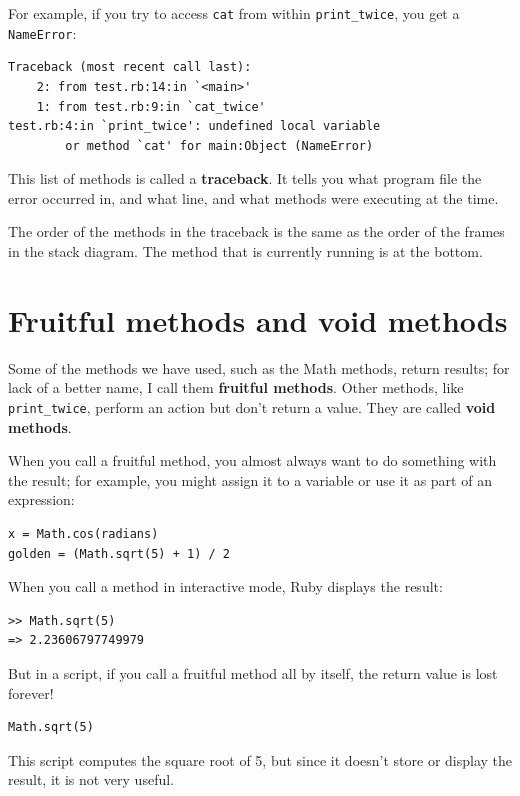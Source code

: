 \documentclass[10pt]{book}
\begin{document}
For example, if you try to access {\tt cat} from within 
\verb"print_twice", you get a {\tt NameError}:

\begin{verbatim}
Traceback (most recent call last):
	2: from test.rb:14:in `<main>'
	1: from test.rb:9:in `cat_twice'
test.rb:4:in `print_twice': undefined local variable
        or method `cat' for main:Object (NameError)
\end{verbatim}
%
This list of methods is called a {\bf traceback}.  It tells you what
program file the error occurred in, and what line, and what methods
were executing at the time.

The order of the methods in the traceback is the same as the
order of the frames in the stack diagram.  The method that is
currently running is at the bottom.


\section{Fruitful methods and void methods}

Some of the methods we have used, such as the Math methods, return
results; for lack of a better name, I call them {\bf fruitful
  methods}.  Other methods, like \verb"print_twice", perform an
action but don't return a value.  They are called {\bf void
  methods}.

When you call a fruitful method, you almost always
want to do something with the result; for example, you might
assign it to a variable or use it as part of an expression:

\begin{verbatim}
x = Math.cos(radians)
golden = (Math.sqrt(5) + 1) / 2
\end{verbatim}
%
When you call a method in interactive mode, Ruby displays
the result:

\begin{verbatim}
>> Math.sqrt(5)
=> 2.23606797749979
\end{verbatim}
%
But in a script, if you call a fruitful method all by itself,
the return value is lost forever!

\begin{verbatim}
Math.sqrt(5)
\end{verbatim}
%
This script computes the square root of 5, but since it doesn't store
or display the result, it is not very useful.
\end{document}
